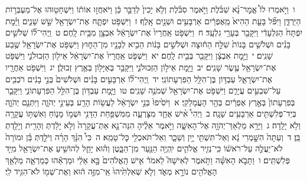 \documentclass[18pt]{article}
\begin{document}
 {\loc ו~}וַיֹּ֣אמְרוּ לוֹ֩ אֱמׇר־נָ֨א שִׁבֹּ֜לֶת וַיֹּ֣אמֶר סִבֹּ֗לֶת וְלֹ֤א יָכִין֙ לְדַבֵּ֣ר כֵּ֔ן וַיֹּאחֲז֣וּ אוֹת֔וֹ וַיִּשְׁחָט֖וּהוּ אֶל־מַעְבְּר֣וֹת הַיַּרְדֵּ֑ן וַיִּפֹּ֞ל בָּעֵ֤ת הַהִיא֙ מֵֽאֶפְרַ֔יִם אַרְבָּעִ֥ים וּשְׁנַ֖יִם אָֽלֶף׃ \startlock
 {\loc ז~}וַיִּשְׁפֹּ֥ט יִפְתָּ֛ח אֶת־יִשְׂרָאֵ֖ל שֵׁ֣שׁ שָׁנִ֑ים וַיָּ֗מׇת יִפְתָּח֙ הַגִּלְעָדִ֔י וַיִּקָּבֵ֖ר בְּעָרֵ֥י גִלְעָֽד׃ \startlock
 {\loc ח~}וַיִּשְׁפֹּ֤ט אַֽחֲרָיו֙ אֶת־יִשְׂרָאֵ֔ל אִבְצָ֖ן מִבֵּ֥ית לָֽחֶם׃ \startlock
 {\loc ט~}וַֽיְהִי־ל֞וֹ שְׁלֹשִׁ֣ים בָּנִ֗ים וּשְׁלֹשִׁ֤ים בָּנוֹת֙ שִׁלַּ֣ח הַח֔וּצָה וּשְׁלֹשִׁ֣ים בָּנ֔וֹת הֵבִ֥יא לְבָנָ֖יו מִן־הַח֑וּץ וַיִּשְׁפֹּ֥ט אֶת־יִשְׂרָאֵ֖ל שֶׁ֥בַע שָׁנִֽים׃ \startlock
 {\loc י~}וַיָּ֣מׇת אִבְצָ֔ן וַיִּקָּבֵ֖ר בְּבֵ֥ית לָֽחֶם׃ \startlock
 {\loc יא~}וַיִּשְׁפֹּ֤ט אַֽחֲרָיו֙ אֶת־יִשְׂרָאֵ֔ל אֵיל֖וֹן הַזְּבוּלֹנִ֑י וַיִּשְׁפֹּ֥ט אֶת־יִשְׂרָאֵ֖ל עֶ֥שֶׂר שָׁנִֽים׃ \startlock
 {\loc יב~}וַיָּ֖מׇת אֵיל֣וֹן הַזְּבוּלֹנִ֑י וַיִּקָּבֵ֥ר בְּאַיָּל֖וֹן בְּאֶ֥רֶץ זְבוּלֻֽן׃ \startlock
 {\loc יג~}וַיִּשְׁפֹּ֥ט אַחֲרָ֖יו אֶת־יִשְׂרָאֵ֑ל עַבְדּ֥וֹן בֶּן־הִלֵּ֖ל הַפִּרְעָתוֹנִֽי׃ \startlock
 {\loc יד~}וַֽיְהִי־ל֞וֹ אַרְבָּעִ֣ים בָּנִ֗ים וּשְׁלֹשִׁים֙ בְּנֵ֣י בָנִ֔ים רֹכְבִ֖ים עַל־שִׁבְעִ֣ים עֲיָרִ֑ם וַיִּשְׁפֹּ֥ט אֶת־יִשְׂרָאֵ֖ל שְׁמֹנֶ֥ה שָׁנִֽים׃ \startlock
 {\loc טו~}וַיָּ֛מׇת עַבְדּ֥וֹן בֶּן־הִלֵּ֖ל הַפִּרְעָתוֹנִ֑י וַיִּקָּבֵ֤ר בְּפִרְעָתוֹן֙ בְּאֶ֣רֶץ אֶפְרַ֔יִם בְּהַ֖ר הָעֲמָלֵקִֽי׃ 
\startlock
 {\loc א~}וַיֹּסִ֙יפוּ֙ בְּנֵ֣י יִשְׂרָאֵ֔ל לַעֲשׂ֥וֹת הָרַ֖ע בְּעֵינֵ֣י יְהֹוָ֑ה וַיִּתְּנֵ֧ם יְהֹוָ֛ה בְּיַד־פְּלִשְׁתִּ֖ים אַרְבָּעִ֥ים שָׁנָֽה׃ \startlock
 {\loc ב~}וַיְהִי֩ אִ֨ישׁ אֶחָ֧ד מִצׇּרְעָ֛ה מִמִּשְׁפַּ֥חַת הַדָּנִ֖י וּשְׁמ֣וֹ מָנ֑וֹחַ וְאִשְׁתּ֥וֹ עֲקָרָ֖ה וְלֹ֥א יָלָֽדָה׃ \startlock
 {\loc ג~}וַיֵּרָ֥א מַלְאַךְ־יְהֹוָ֖ה אֶל־הָאִשָּׁ֑ה וַיֹּ֣אמֶר אֵלֶ֗יהָ הִנֵּה־נָ֤א אַתְּ־עֲקָרָה֙ וְלֹ֣א יָלַ֔דְתְּ וְהָרִ֖ית וְיָלַ֥דְתְּ בֵּֽן׃ \startlock
 {\loc ד~}וְעַתָּה֙ הִשָּׁ֣מְרִי נָ֔א וְאַל־תִּשְׁתִּ֖י יַ֣יִן וְשֵׁכָ֑ר וְאַל־תֹּאכְלִ֖י כׇּל־טָמֵֽא׃ \startlock
 {\loc ה~}כִּי֩ הִנָּ֨ךְ הָרָ֜ה וְיֹלַ֣דְתְּ בֵּ֗ן וּמוֹרָה֙ לֹא־יַעֲלֶ֣ה עַל־רֹאשׁ֔וֹ כִּֽי־נְזִ֧יר אֱלֹהִ֛ים יִֽהְיֶ֥ה הַנַּ֖עַר מִן־הַבָּ֑טֶן וְה֗וּא יָחֵ֛ל לְהוֹשִׁ֥יעַ אֶת־יִשְׂרָאֵ֖ל מִיַּ֥ד פְּלִשְׁתִּֽים׃ \startlock
 {\loc ו~}וַתָּבֹ֣א הָאִשָּׁ֗ה וַתֹּ֣אמֶר לְאִישָׁהּ֮ לֵאמֹר֒ אִ֤ישׁ הָֽאֱלֹהִים֙ בָּ֣א אֵלַ֔י וּמַרְאֵ֕הוּ כְּמַרְאֵ֛ה מַלְאַ֥ךְ הָאֱלֹהִ֖ים נוֹרָ֣א מְאֹ֑ד וְלֹ֤א שְׁאִלְתִּ֙יהוּ֙ אֵֽי־מִזֶּ֣ה ה֔וּא וְאֶת־שְׁמ֖וֹ לֹא־הִגִּ֥יד לִֽי׃ \startlock
\end{document}
